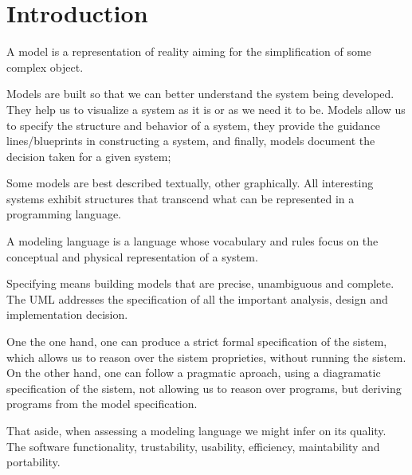 \section{Introduction}

\indent
\par A model is a representation of reality aiming for the simplification of some complex object.

\par Models are built so that we can better understand the system being developed.
They help us to visualize a system as it is or as we need it to be. Models allow us to specify the structure and behavior of a system, they provide the guidance lines/blueprints in constructing a system, and finally, models document the decision taken for a given system;


\par Some models are best described textually, other graphically. All interesting systems exhibit structures that transcend what can be represented in a programming language.


\par A modeling language is a language whose vocabulary and rules focus on the conceptual and physical representation of a system.%

\par Specifying means building models that are precise, unambiguous and complete. The UML addresses the specification of all the important analysis, design and implementation decision. %

\par One the one hand, one can produce a strict formal specification of the sistem, which allows us to reason over the sistem proprieties, without running the sistem. On the other hand, one can follow a pragmatic aproach, using a diagramatic specification of the sistem, not allowing us to reason over programs, but deriving programs from the model specification.





\par That aside, when assessing a modeling language we might infer on its quality. The software functionality, trustability, usability, efficiency, maintability and portability.


